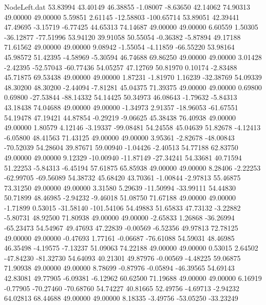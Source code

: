 \begin{filecontents}{NodeLeft.dat}
  53.83994   43.40149   46.38855    -1.08007   -8.63650   42.14062   74.90313   49.00000   49.00000    5.59851    2.61145  -12.58803 -100.65714
  53.89051   42.39441   47.49695    -3.15719   -6.77425   44.65313   74.14687   49.00000   49.00000    6.60559    1.50305  -36.12877  -77.51996
  53.94120   39.91058   50.55054    -0.36382   -5.87894   49.17188   71.61562   49.00000   49.00000    9.08942   -1.55054   -4.11859  -66.55220
  53.98164   45.98572   51.42395    -4.58969   -5.30594   46.74688   69.86250   49.00000   49.00000    3.01428   -2.42395  -52.57043  -60.77436
  54.05257   47.12769   50.81970     0.10174   -2.83488   45.71875   69.53438   49.00000   49.00000    1.87231   -1.81970    1.16239  -32.38769
  54.09339   48.30200   48.30200    -2.44094   -7.81281   45.04375   71.39375   49.00000   49.00000    0.69800    0.69800  -27.53844  -88.14332
  54.14425   50.34973   46.08643    -1.79632   -5.84313   43.18438   74.04688   49.00000   49.00000   -1.34973    2.91357  -18.96053  -61.67551
  54.19478   47.19421   44.87854    -0.29219   -9.06625   45.38438   76.40938   49.00000   49.00000    1.80579    4.12146   -3.19337  -99.08481
  54.24558   45.04639   51.82678    -4.12413   -6.05800   48.41563   71.43125   49.00000   49.00000    3.95361   -2.82678  -48.00843  -70.52039
  54.28604   39.87671   59.00940    -1.04426   -2.40513   54.77188   62.83750   49.00000   49.00000    9.12329  -10.00940  -11.87149  -27.34241
  54.33681   40.71594   51.22253    -5.84313   -6.45194   57.61875   65.85938   49.00000   49.00000    8.28406   -2.22253  -62.99705  -69.56089
  54.38732   45.68420   43.70361    -1.00844   -2.97813   55.46875   73.31250   49.00000   49.00000    3.31580    5.29639  -11.50994  -33.99111
  54.44830   50.71899   48.46985    -2.94232   -9.46018   51.08750   71.67188   49.00000   49.00000   -1.71899    0.53015  -31.58140 -101.54106
  54.49883   51.65833   47.73132    -3.22882   -5.80731   48.92500   71.80938   49.00000   49.00000   -2.65833    1.26868  -36.26994  -65.23473
  54.54967   49.47693   47.22839    -0.00569   -6.52356   49.97813   72.78125   49.00000   49.00000   -0.47693    1.77161   -0.06687  -76.61088
  54.59031   48.46985   46.35498    -4.19575   -7.13237   51.09063   74.22188   49.00000   49.00000    0.53015    2.64502  -47.84230  -81.32730
  54.64093   40.21301   49.87976    -0.00569   -4.48225   59.06875   71.90938   49.00000   49.00000    8.78699   -0.87976   -0.05894  -46.39565
  54.69143   42.83081   49.77905    -6.09381   -6.12962   60.62500   71.19688   49.00000   49.00000    6.16919   -0.77905  -70.27460  -70.68760
  54.74227   40.81665   52.49756    -4.69713   -2.94232   64.02813   68.44688   49.00000   49.00000    8.18335   -3.49756  -53.05250  -33.23249

\end{filecontents}
